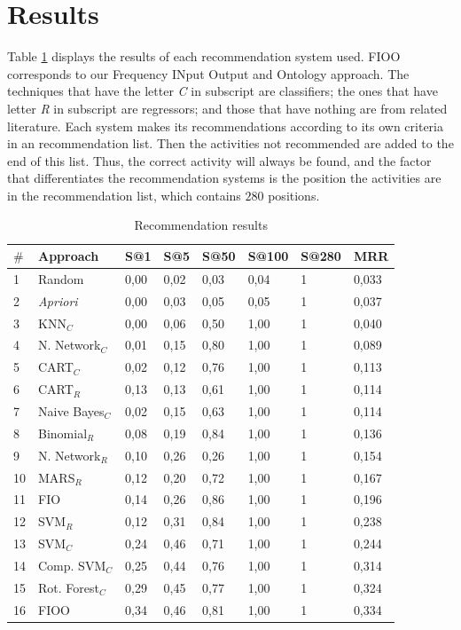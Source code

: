 \documentclass{doublecol-new}
\theoremstyle{TH}{
\newtheorem{lemma}{Lemma}
\newtheorem{theorem}[lemma]{Theorem}
\newtheorem{corrolary}[lemma]{Corrolary}
\newtheorem{conjecture}[lemma]{Conjecture}
\newtheorem{proposition}[lemma]{Proposition}
\newtheorem{claim}[lemma]{Claim}
\newtheorem{stheorem}[lemma]{Wrong Theorem}
\newtheorem{algorithm}{Algorithm}
}
\theoremstyle{THrm}{
\newtheorem{definition}{Definition}[section]
\newtheorem{question}{Question}[section]
\newtheorem{remark}{Remark}
\newtheorem{scheme}{Scheme}
}
\theoremstyle{THhit}{
\newtheorem{case}{Case}[section]
}
\begin{document}
\section*{Results}
Table \ref{tb_resultadosExperimentos} displays the results of each recommendation system used. FIOO corresponds to our Frequency INput Output and Ontology approach. The techniques that have the letter \emph{C} in subscript are classifiers; the ones that have letter \emph{R} in subscript are regressors; and those that have nothing are from related literature. Each system makes its recommendations according to its own criteria in an recommendation list. Then the activities not recommended are added to the end of this list. Thus, the correct activity will always be found, and the factor that differentiates the recommendation systems is the position the activities are in the recommendation list, which contains \(280\) positions.
\bgroup
\begin{table}[!htp]
	\tiny
	\caption{Recommendation results}
	\begin{tabular}{|l|l|l|l|l|l|l|l|} \hline
		\tiny
		\textbf{\(\mathbf{\#}\)} & \textbf{Approach}&\textbf{S@1}&\textbf{S@5} & \textbf{S@50} & \textbf{S@100} & \textbf{S@280} & \textbf{MRR} \\ \hline
		
		1  & Random					& 0,00 & 0,02 & 0,03 & 0,04 & 1 & 0,033 \\ \hline
		2  & \emph{Apriori}			& 0,00 & 0,03 & 0,05 & 0,05 & 1 & 0,037 \\ \hline
		3  & KNN\(_C\)				& 0,00 & 0,06 & 0,50 & 1,00 & 1 & 0,040 \\ \hline
		4  & N. Network\(_C\)		& 0,01 & 0,15 & 0,80 & 1,00 & 1 & 0,089 \\ \hline
		5  & CART\(_C\)				& 0,02 & 0,12 & 0,76 & 1,00 & 1 & 0,113 \\ \hline
		6  & CART\(_R\)    			& 0,13 & 0,13 & 0,61 & 1,00 & 1 & 0,114 \\ \hline
		7  & Naive Bayes\(_C\)     	& 0,02 & 0,15 & 0,63 & 1,00 & 1 & 0,114 \\ \hline
		8  & Binomial\(_R\) 		& 0,08 & 0,19 & 0,84 & 1,00 & 1 & 0,136 \\ \hline
		9  & N. Network\(_R\)   	& 0,10 & 0,26 & 0,26 & 1,00 & 1 & 0,154 \\ \hline
		10 & MARS\(_R\)     		& 0,12 & 0,20 & 0,72 & 1,00 & 1 & 0,167 \\ \hline
		11 & FIO           			& 0,14 & 0,26 & 0,86 & 1,00 & 1 & 0,196 \\ \hline
		12 & SVM\(_R\)     			& 0,12 & 0,31 & 0,84 & 1,00 & 1 & 0,238 \\ \hline
		13 & SVM\(_C\)    			& 0,24 & 0,46 & 0,71 & 1,00 & 1 & 0,244 \\ \hline
		14 & Comp. SVM\(_C\)		& 0,25 & 0,44 & 0,76 & 1,00 & 1 & 0,314 \\ \hline
		15 & Rot. Forest\(_C\)  	& 0,29 & 0,45 & 0,77 & 1,00 & 1 & 0,324 \\ \hline
		16 & FIOO          			& 0,34 & 0,46 & 0,81 & 1,00 & 1 & 0,334 \\ \hline
	\end{tabular}
	\label{tb_resultadosExperimentos}
	\vspace{0.1cm}
\end{table}
\end{document}
